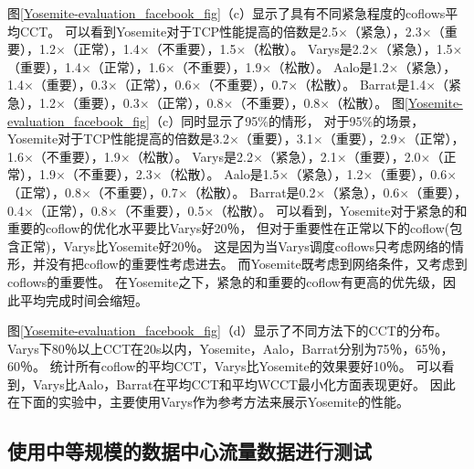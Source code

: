 图\ref{Yosemite-evaluation_facebook_fig}（c）显示了具有不同紧急程度的coflows平均CCT。
可以看到Yosemite对于TCP性能提高的倍数是2.5$\times$（紧急），2.3$\times$（重要），1.2$\times$（正常），1.4$\times$（不重要），1.5$\times$（松散）。
Varys是2.2$\times$（紧急），1.5$\times$（重要），1.4$\times$（正常），1.6$\times$（不重要），1.9$\times$（松散）。
Aalo是1.2$\times$（紧急），1.4$\times$（重要），0.3$\times$（正常），0.6$\times$（不重要），0.7$\times$（松散）。
Barrat是1.4$\times$（紧急），1.2$\times$（重要），0.3$\times$（正常），0.8$\times$（不重要），0.8$\times$（松散）。
图\ref{Yosemite-evaluation_facebook_fig}（c）同时显示了95$\%$的情形，
对于95$\%$的场景，Yosemite对于TCP性能提高的倍数是3.2$\times$（重要），3.1$\times$（重要），2.9$\times$（正常），1.6$\times$（不重要），1.9$\times$（松散）。
Varys是2.2$\times$（紧急），2.1$\times$（重要），2.0$\times$（正常），1.9$\times$（不重要），2.3$\times$（松散）。
Aalo是1.5$\times$（紧急），1.2$\times$（重要），0.6$\times$（正常），0.8$\times$（不重要），0.7$\times$（松散）。
Barrat是0.2$\times$（紧急），0.6$\times$（重要），0.4$\times$（正常），0.8$\times$（不重要），0.5$\times$（松散）。
可以看到，Yosemite对于紧急的和重要的coflow的优化水平要比Varys好20％，
但对于重要性在正常以下的coflow(包含正常)，Varys比Yosemite好20％。
这是因为当Varys调度coflows只考虑网络的情形，并没有把coflow的重要性考虑进去。
而Yosemite既考虑到网络条件，又考虑到coflows的重要性。
在Yosemite之下，紧急的和重要的coflow有更高的优先级，因此平均完成时间会缩短。

图\ref{Yosemite-evaluation_facebook_fig}（d）显示了不同方法下的CCT的分布。
Varys下80％以上CCT在20s以内，Yosemite，Aalo，Barrat分别为75％，65％，60％。
统计所有coflow的平均CCT，Varys比Yosemite的效果要好10％。
可以看到，Varys比Aalo，Barrat在平均CCT和平均WCCT最小化方面表现更好。
因此在下面的实验中，主要使用Varys作为参考方法来展示Yosemite的性能。

\subsection{使用中等规模的数据中心流量数据进行测试}

